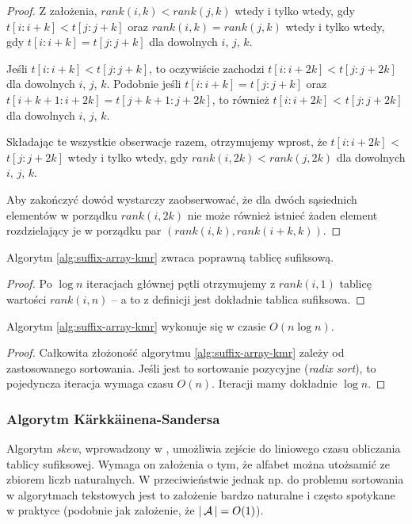 \begin{proof}
  Z założenia, $rank(i, k) < rank(j, k)$ wtedy i tylko wtedy, gdy $t[i: i + k] < t[j: j + k]$ oraz $rank(i, k) = rank(j, k)$ wtedy i tylko wtedy, gdy $t[i: i + k] = t[j: j + k]$ dla dowolnych $i$, $j$, $k$.

  Jeśli $t[i: i + k] < t[j: j + k]$, to oczywiście zachodzi $t[i: i + 2 k] < t[j: j + 2 k]$ dla dowolnych $i$, $j$, $k$.
  Podobnie jeśli $t[i: i + k] = t[j: j + k]$ oraz $t[i + k + 1: i + 2 k] = t[j + k + 1: j + 2 k]$, to również $t[i: i + 2 k]$ < $t[j: j + 2 k]$ dla dowolnych $i$, $j$, $k$.

  Składając te wszystkie obserwacje razem, otrzymujemy wprost, że $t[i: i + 2 k]$ < $t[j: j + 2 k]$ wtedy i tylko wtedy, gdy $rank(i, 2 k) < rank(j, 2 k)$ dla dowolnych $i$, $j$, $k$.

  Aby zakończyć dowód wystarczy zaobserwować, że dla dwóch sąsiednich elementów w porządku $rank(i, 2 k)$ nie może również istnieć żaden element rozdzielający je w porządku par $(rank(i, k), rank(i + k, k))$.
\end{proof}

\begin{corollary}{}{}
  Algorytm \ref{alg:suffix-array-kmr} zwraca poprawną tablicę sufiksową.
\end{corollary}

\begin{proof}
  Po $\log{n}$ iteracjach głównej pętli otrzymujemy z $rank(i, 1)$ tablicę wartości $rank(i, n)$ -- a to z definicji jest dokładnie tablica sufiksowa.
\end{proof}

\begin{theorem}{}{}
  Algorytm \ref{alg:suffix-array-kmr} wykonuje się w czasie $O(n \log{n})$.
\end{theorem}

\begin{proof}
  Całkowita złożoność algorytmu \ref{alg:suffix-array-kmr} zależy od zastosowanego sortowania.
  Jeśli jest to sortowanie pozycyjne (\emph{radix sort}), to pojedyncza iteracja wymaga czasu $O(n)$. Iteracji mamy dokładnie $\log{n}$.
\end{proof}

\subsubsection{Algorytm K\"arkk\"ainena-Sandersa}

Algorytm \emph{skew}, wprowadzony w \citep{karkkainen2003simple}, umożliwia zejście do liniowego czasu obliczania tablicy sufiksowej.
Wymaga on założenia o tym, że alfabet można utożsamić ze zbiorem liczb naturalnych. W przeciwieństwie jednak np. do problemu sortowania w algorytmach tekstowych jest to założenie bardzo naturalne i często spotykane w praktyce (podobnie jak założenie, że $|\operatorname{\mathcal{A}}| = O(1)$).

